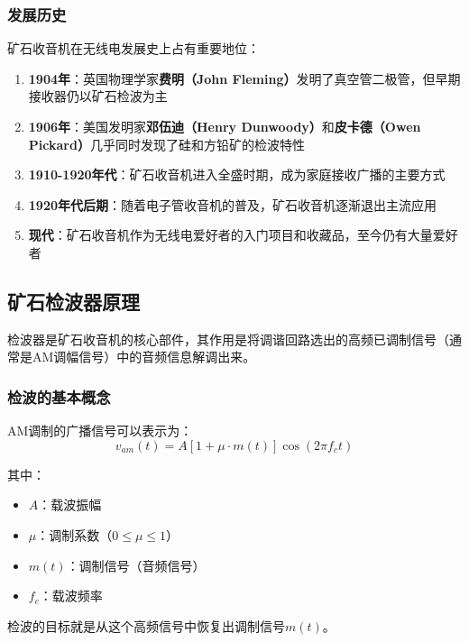 \subsubsection{发展历史}
\label{sec:crystal_radio_history}

矿石收音机在无线电发展史上占有重要地位：

\begin{enumerate}
    \item \textbf{1904年}：英国物理学家\textbf{费明（John Fleming）}发明了真空管二极管，但早期接收器仍以矿石检波为主
    \item \textbf{1906年}：美国发明家\textbf{邓伍迪（Henry Dunwoody）}和\textbf{皮卡德（Owen Pickard）}几乎同时发现了硅和方铅矿的检波特性
    \item \textbf{1910-1920年代}：矿石收音机进入全盛时期，成为家庭接收广播的主要方式
    \item \textbf{1920年代后期}：随着电子管收音机的普及，矿石收音机逐渐退出主流应用
    \item \textbf{现代}：矿石收音机作为无线电爱好者的入门项目和收藏品，至今仍有大量爱好者
\end{enumerate}

\subsection{矿石检波器原理}
\label{sec:crystal_detector_principle}

检波器是矿石收音机的核心部件，其作用是将调谐回路选出的高频已调制信号（通常是AM调幅信号）中的音频信息解调出来。

\subsubsection{检波的基本概念}
\label{sec:detection_concept}

AM调制的广播信号可以表示为：
\begin{equation}
v_{am}(t) = A[1 + \mu \cdot m(t)] \cos(2\pi f_c t)
\end{equation}

其中：
\begin{itemize}
    \item $A$：载波振幅
    \item $\mu$：调制系数（0$\leq \mu \leq 1$）
    \item $m(t)$：调制信号（音频信号）
    \item $f_c$：载波频率
\end{itemize}

检波的目标就是从这个高频信号中恢复出调制信号$m(t)$。

